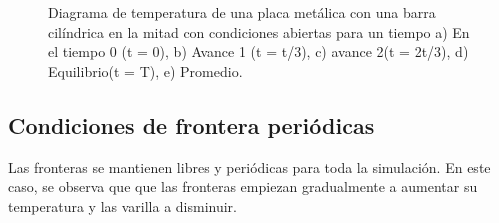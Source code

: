\documentclass{article}
\begin{document}
\begin{figure}[H]
    \caption{Diagrama de temperatura de una placa metálica con una barra cilíndrica en la mitad con condiciones abiertas para un tiempo a) En el tiempo 0 (t = 0), b) Avance 1 (t = t/3), c) avance 2(t = 2t/3), d) Equilibrio(t = T), e) Promedio.}
    \label{fig:CondicionesFijasTemp}
\end{figure}
\subsection*{Condiciones de frontera periódicas}
Las fronteras se mantienen libres y periódicas para toda la simulación. En este caso, se observa que que las fronteras empiezan gradualmente a aumentar su temperatura y las  varilla a disminuir.
\begin{figure}[H]
    \centering

\end{figure}
\end{document}
